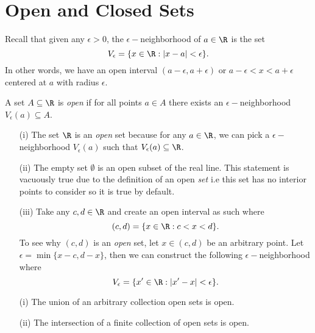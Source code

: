 

\section{Open and Closed Sets}

Recall that given any \( \epsilon >0 \), the \( \epsilon-\)neighborhood of \( a \in \R  \) is the set 
\[ V_{\epsilon } = \{ x \in \R : | x - a | < \epsilon  \}.\]
In other words, we have an open interval \( (a -\epsilon , a + \epsilon ) \) or \( a - \epsilon < x < a + \epsilon  \) centered at \( a \) with radius \( \epsilon  \). 

\begin{tcolorbox}
\begin{defn}
    A set \( A \subseteq \R  \) is \textit{open} if for all points \( a \in A \) there exists an \( \epsilon - \)neighborhood \(  V_{\epsilon }(a) \subseteq A \). 
\end{defn}
\end{tcolorbox}

\begin{ex}
\begin{enumerate}
    \item[(i)] The set \( \R  \) is an \textit{open} set because for any \( a \in \R  \), we can pick a \( \epsilon- \)neighborhood \( V_{\epsilon }(a) \) such that \( V_{\epsilon } (a) \subseteq \R \). 
    \item[(ii)] The empty set \( \emptyset \) is an open subset of the real line. This statement is vacuously true due to the definition of an open \textit{set} i.e this set has no interior points to consider so it is true by default. 
    \item[(iii)] Take any \( c,d \in \R  \) and create an open interval as such where 
        \[  (c,d) = \{ x \in \R : c < x < d \}.\] To see why \( (c,d) \) is an \textit{open} set, let \( x \in (c,d) \) be an arbitrary point. Let \(  \epsilon = \min\{ x - c, d -x  \}  \), then we can construct the following \( \epsilon-\)neighborhood where
        \[  V_{\epsilon} = \{ x' \in \R : | x' - x  | < \epsilon \}.  \]
\end{enumerate}
\end{ex}

\begin{tcolorbox}
\begin{thm}
\begin{enumerate}
    \item[(i)] The union of an arbitrary collection open sets is open.
    \item[(ii)] The intersection of a finite collection of open sets is open. 
\end{enumerate}
\end{thm}
\end{tcolorbox}

